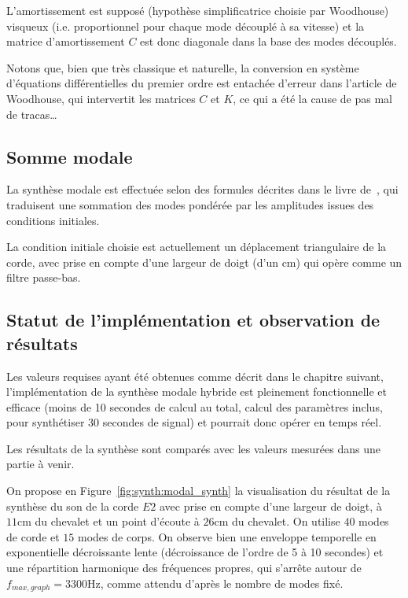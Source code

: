   L'amortissement est supposé (hypothèse simplificatrice choisie par Woodhouse)
visqueux (i.e. proportionnel pour chaque mode découplé à sa vitesse) et la
matrice d'amortissement \( C \) est donc diagonale dans la base des
modes découplés.

Notons que, bien que très classique et naturelle, la conversion en système
d'équations différentielles du premier ordre est entachée d'erreur dans
l'article de Woodhouse, qui intervertit les matrices \( C \) et \( K \), ce
qui a été la cause de pas mal de tracas\dots

\subsection{Somme modale}

  La synthèse modale est effectuée selon des formules décrites
dans le livre de~\textcite{newland}, qui traduisent une sommation des modes
pondérée par les amplitudes issues des conditions initiales.

  La condition initiale choisie est actuellement un déplacement triangulaire
de la corde, avec prise en compte d'une largeur de doigt (d'un \( \si{\cm} \))
qui opère comme un filtre passe-bas.

\subsection{Statut de l'implémentation et observation de résultats}

Les valeurs requises ayant été obtenues comme décrit dans le chapitre suivant,
l'implémentation de la synthèse modale hybride est pleinement fonctionnelle
et efficace (moins de 10 secondes de calcul au total, calcul des paramètres
inclus, pour synthétiser 30 secondes de signal) et pourrait donc opérer en
temps réel.

Les résultats de la synthèse sont comparés avec les valeurs mesurées dans une
partie à venir.

On propose en Figure~\ref{fig:synth:modal_synth} la visualisation du résultat
de la synthèse du son de la corde \( E2 \) avec prise en compte d'une largeur
de doigt, à \( \si{11\cm} \) du chevalet et un point d'écoute à
\( \si{26\cm} \) du chevalet.
On utilise \( 40 \) modes de corde et \( 15 \) modes de corps.
On observe bien une enveloppe temporelle en exponentielle décroissante lente
(décroissance de l'ordre de 5 à 10 secondes) et une répartition harmonique
des fréquences propres, qui s'arrête autour de
\( f_{max, graph} = \si{3300\Hz} \), comme attendu d'après le nombre de modes
fixé.

